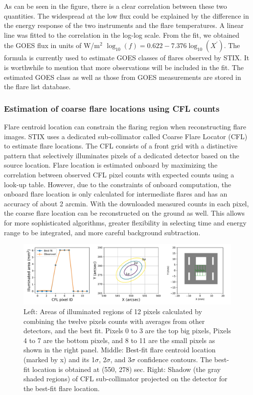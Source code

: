 \documentclass[referee]{aa} %
\begin{document}
As can be seen in the figure, there is a clear correlation between
these two quantities.  The widespread at the low flux could be explained by the difference in 
the energy response of the two instruments and the flare temperatures. 
A linear line was fitted to the correlation in the log-log scale. 
From the fit, we obtained 
the GOES flux in units of W/m$^2$ $\log_{10}(f) = 0.622 -7.376 \log_{10} (X^{'})$.
The formula is currently used to estimate GOES classes of flares observed by STIX. 
It is worthwhile to mention that more observations will be included in the fit.
The estimated GOES class as well as those from GOES measurements 
are stored in the flare list database. 

\subsubsection{Estimation of coarse flare locations using CFL counts}
Flare centroid location can constrain the flaring region when reconstructing flare images.
STIX uses a dedicated sub-collimator called Coarse Flare Locator (CFL) to estimate flare locations.
The CFL consists of a front grid with
a distinctive pattern that selectively illuminates pixels of a 
dedicated detector based on the source location.
Flare location is estimated onboard by maximizing the correlation between observed CFL pixel counts 
with expected counts using a look-up table. 
However, due to the constraints of onboard computation, the onboard flare location is  only calculated for intermediate flares 
and has an accuracy of about 2 arcmin. 
With the downloaded measured counts in each pixel,
the coarse flare location can be reconstructed on the ground as well. 
This allows for more sophisticated algorithms, greater flexibility in selecting time and energy 
range to be integrated, and more careful background subtraction.

\begin{figure}
  \centering
  \includegraphics[width=0.95\linewidth]{figures/cflMay07.pdf}
  \caption{
   Left: Areas of illuminated regions of 12 pixels calculated by combining
  the twelve pixels counts with averages from other detectors, and the best fit. 
  Pixels 0 to 3 are the top big pixels, Pixels 4 to 7 are the bottom pixels, and 8 to 11 are the small pixels as shown in the right panel.
   Middle: Best-fit flare centroid location (marked by x) and its 1$\sigma$, 2$\sigma$, and 3$\sigma$ confidence contours.
   The best-fit location is obtained at (550, 278) sec. 
    Right:  Shadow (the gray shaded regions) of CFL sub-collimator projected on the detector 
  for the best-fit flare location. }
  \label{fig:cfl}
\end{figure}
\end{document}
